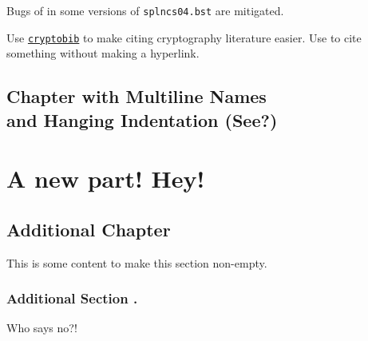Bugs of \texttt{\string\doi}
in some versions of \texttt{splncs04.bst}
are mitigated.

Use
\href{https://github.com/cryptobib/export}{\texttt{cryptobib}}
to make citing cryptography literature easier.
Use \texttt{\string\citenolink} to
cite something without making a hyperlink.

\chapter
[Chapter with Multiline Names
\tocchaplinebreak\tocchaphanging
and Hanging Indentation
\tocchaplinebreak
(See?)]
{Chapter with Multiline Names
\\and Hanging Indentation (See?)}

\long\def\myrepeat#1\relax{#1\relax#1\relax}
\long\def\myloop#1\relaxed{#1\relaxed#1\relaxed#1\relaxed}
\let\relaxed\relax
{}

\myrepeat\myrepeat
\part{A new part! Hey!}
\myrepeat\myrepeat\myrepeat
{}
\chapter{Additional Chapter }
This is some content to make this section non-empty.
\setcounter{mysectioncounter}{0}
\myloop\myloop
{}
\section{Additional Section .}
Who says no?!
\relaxed
\relax

\let\myrepeat\relax
\let\mychapter\relax
